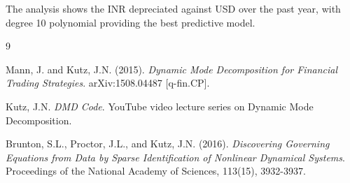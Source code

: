 \documentclass[12pt,a4paper]{article}
\begin{document}
The analysis shows the INR depreciated against USD over the past year, with degree 10 polynomial providing the best predictive model.

\newpage
\begin{thebibliography}{9}

Mann, J. and Kutz, J.N. (2015). 
\textit{Dynamic Mode Decomposition for Financial Trading Strategies}. 
arXiv:1508.04487 [q-fin.CP].

Kutz, J.N. 
\textit{DMD Code}. 
YouTube video lecture series on Dynamic Mode Decomposition.

Brunton, S.L., Proctor, J.L., and Kutz, J.N. (2016).
\textit{Discovering Governing Equations from Data by Sparse Identification of Nonlinear Dynamical Systems}.
Proceedings of the National Academy of Sciences, 113(15), 3932-3937.

\end{thebibliography}
\end{document}
